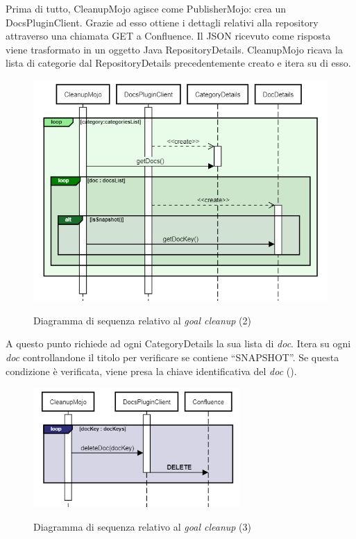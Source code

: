 Prima di tutto, CleanupMojo agisce come PublisherMojo: crea un DocsPluginClient.
Grazie ad esso ottiene i dettagli relativi alla repository attraverso una chiamata GET a Confluence.
Il JSON ricevuto come risposta viene trasformato in un oggetto Java RepositoryDetails.
CleanupMojo ricava la lista di categorie dal RepositoryDetails precedentemente creato e itera su di esso.

\begin{figure}[H]
    \centering
    \includegraphics[width=\textwidth]{immagini/CleanupSeq2.png}\\
    \caption{Diagramma di sequenza relativo al \emph{goal cleanup} (2)}
\end{figure}

A questo punto richiede ad ogni CategoryDetails la sua lista di \emph{doc}.
Itera su ogni \emph{doc} controllandone il titolo per verificare se contiene ``SNAPSHOT''.
Se questa condizione è verificata, viene presa la chiave identificativa del \emph{doc} ().

\begin{figure}[H]
    \centering
    \includegraphics[width=0.7\textwidth]{immagini/CleanupSeq3.png}\\
    \caption{Diagramma di sequenza relativo al \emph{goal cleanup} (3)}
\end{figure}


